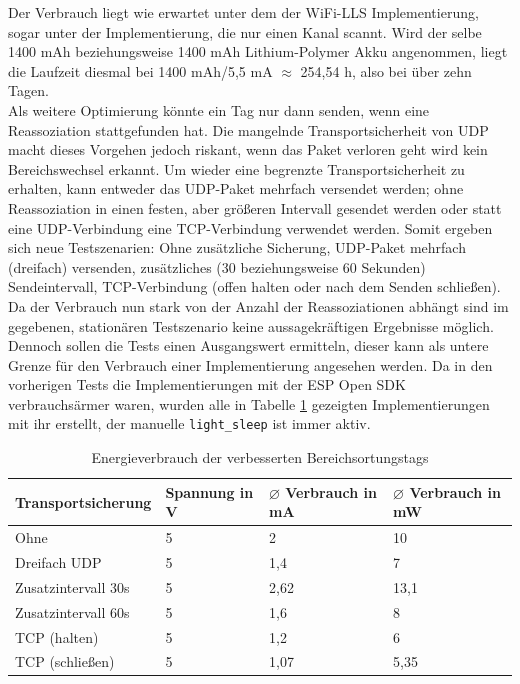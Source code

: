 Der Verbrauch liegt wie erwartet unter dem der WiFi-LLS Implementierung, sogar unter der Implementierung, die nur einen Kanal scannt.
Wird der selbe 1400 mAh beziehungsweise 1400 mAh Lithium-Polymer Akku angenommen, liegt die Laufzeit diesmal  bei 1400 mAh/5,5 mA $\approx$ 254,54 h, also bei über zehn Tagen. \\
Als weitere Optimierung könnte ein Tag nur dann senden, wenn eine Reassoziation stattgefunden hat.
Die mangelnde Transportsicherheit von UDP macht dieses Vorgehen jedoch riskant, wenn das Paket verloren geht wird kein Bereichswechsel erkannt.
Um wieder eine begrenzte Transportsicherheit zu erhalten, kann entweder das UDP-Paket mehrfach versendet werden; ohne Reassoziation in einen festen, aber größeren Intervall gesendet werden oder statt eine UDP-Verbindung eine TCP-Verbindung verwendet werden.
Somit ergeben sich neue Testszenarien: Ohne zusätzliche Sicherung, UDP-Paket mehrfach (dreifach) versenden, zusätzliches (30 beziehungsweise 60 Sekunden) Sendeintervall, TCP-Verbindung (offen halten oder nach dem Senden schließen). \\
Da der Verbrauch nun stark von der Anzahl der Reassoziationen abhängt sind im gegebenen, stationären Testszenario keine aussagekräftigen Ergebnisse möglich.
Dennoch sollen die Tests einen Ausgangswert ermitteln, dieser kann als untere Grenze für den Verbrauch einer Implementierung angesehen werden.
Da in den vorherigen Tests die Implementierungen mit der ESP Open SDK verbrauchsärmer waren, wurden alle in Tabelle \ref{table:naiveoptconsumption} gezeigten Implementierungen mit ihr erstellt, der manuelle \texttt{light\_sleep} ist immer aktiv.

\begin{table}[h]
	\centering
	\caption{Energieverbrauch der verbesserten Bereichsortungstags}
	\label{table:naiveoptconsumption}
	\begin{tabular}{p{3.5cm}|p{1.7cm}|p{2.5cm}|p{2.5cm}}
		Transportsicherung & Spannung in V & $\varnothing$ Verbrauch in mA & $\varnothing$ Verbrauch in mW \\
		\hline
		Ohne & 5 & 2 & 10 \\
		Dreifach UDP & 5 & 1,4 & 7 \\
		Zusatzintervall 30s & 5 & 2,62 & 13,1 \\
		Zusatzintervall 60s & 5 & 1,6 & 8 \\
		TCP (halten) & 5 & 1,2 & 6 \\
		TCP (schließen) & 5 & 1,07 & 5,35 \\
	\end{tabular}
\end{table}

